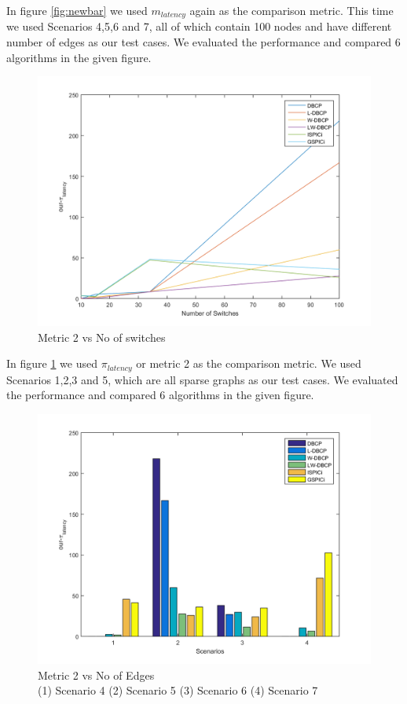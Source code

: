\documentclass[10pt]{extarticle}
\begin{document}
	In figure \ref{fig:newbar} we used $m_{latency}$ again as the comparison metric. This time we used Scenarios 4,5,6 and 7, all of which contain 100 nodes and have different number of edges as our test cases. We evaluated the performance and compared 6 algorithms in the given figure.
	
	\begin{figure}
		\includegraphics[width=\linewidth]{ourgraph.png}
		\caption{Metric 2 vs No of switches}
		\label{fig:ourgraph}
	\end{figure}
	
	In figure \ref{fig:ourgraph} we used $\pi_{latency}$ or metric 2 as the comparison metric. We used Scenarios 1,2,3 and 5, which are all sparse graphs as our test cases. We evaluated the performance and compared 6 algorithms in the given figure.
	
	\begin{figure}
		\includegraphics[width=\linewidth]{ourbar.png}
		\caption{Metric 2 vs No of Edges \\ (1) Scenario 4  (2) Scenario 5  (3) Scenario 6  (4) Scenario 7}
		\label{fig:ourbar}
	\end{figure}
	
\end{document}
